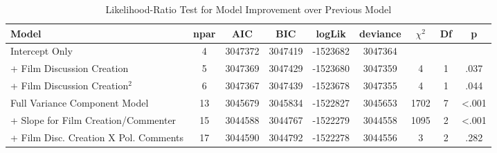 \begin{table}[tb]
\begin{threeparttable}
\caption{Likelihood-Ratio Test for Model Improvement over Previous Model} 
\label{tab:Anova}
\begingroup{}
\begin{tabular}{l @{}S[table-format=2.0]@{} *{4}{@{}S[table-format=-7.0]@{}} @{}S[table-format=4.0]@{} @{ }S[table-format=2.0]@{} @{ }S[table-format=<.3]@{}}
  \toprule
Model & {npar} & {AIC} & {BIC} & {logLik} & {deviance} & {$\chi^2$} & {Df} & {p} \\ 
  \midrule
Intercept Only & 4 & 3047372 & 3047419 & -1523682 & 3047364 &  &  &  \\ 
  + Film Discussion Creation & 5 & 3047369 & 3047429 & -1523680 & 3047359 & 4 & 1 & .037 \\ 
  + Film Discussion Creation$^{2}$ & 6 & 3047367 & 3047439 & -1523678 & 3047355 & 4 & 1 & .044 \\ 
  Full Variance Component Model & 13 & 3045679 & 3045834 & -1522827 & 3045653 & 1702 & 7 & <.001 \\ 
  + Slope for Film Creation/Commenter & 15 & 3044588 & 3044767 & -1522279 & 3044558 & 1095 & 2 & <.001 \\ 
  + Film Disc. Creation X Pol. Comments & 17 & 3044590 & 3044792 & -1522278 & 3044556 & 3 & 2 & .282 \\ 
   \bottomrule
\end{tabular}
\endgroup
\end{threeparttable}
\end{table}

